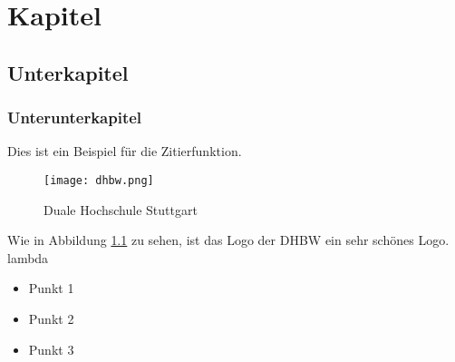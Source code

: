 \chapter{Kapitel}
   
\section{Unterkapitel}

\subsection{Unterunterkapitel}

Dies ist ein Beispiel für die Zitierfunktion. \cite[Vgl.][S. 1 ff.]{Mustermann2023} 



\newpage

\begin{figure}[h]
    \centering
    \texttt{[image: dhbw.png]}
    \caption{Duale Hochschule Stuttgart \cite{Mustermann2023}}
    \label{fig:DHBW_Logo}
\end{figure}


Wie in Abbildung \ref{fig:DHBW_Logo} zu sehen, ist das Logo der \ac{DHBW} ein sehr schönes Logo. \ac{lambda}


\begin{itemize}[label=\textbullet]
    \item Punkt 1
    \item Punkt 2
    \item Punkt 3
\end{itemize}